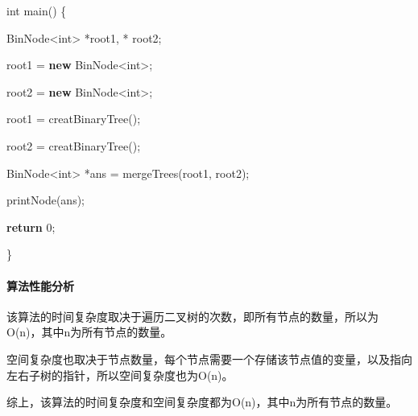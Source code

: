 \documentclass[
]{article}
\newenvironment{Shaded}{}{}
\newcommand{\ControlFlowTok}[1]{\textcolor[rgb]{0.00,0.44,0.13}{\textbf{#1}}}
\newcommand{\DataTypeTok}[1]{\textcolor[rgb]{0.56,0.13,0.00}{#1}}
\newcommand{\DecValTok}[1]{\textcolor[rgb]{0.25,0.63,0.44}{#1}}
\newcommand{\KeywordTok}[1]{\textcolor[rgb]{0.00,0.44,0.13}{\textbf{#1}}}
\newcommand{\NormalTok}[1]{#1}
\newcommand{\OperatorTok}[1]{\textcolor[rgb]{0.40,0.40,0.40}{#1}}
\begin{document}
\begin{Shaded}
\begin{Highlighting}[]
\DataTypeTok{int}\NormalTok{ main}\OperatorTok{()} \OperatorTok{\{}



\NormalTok{	BinNode}\OperatorTok{\textless{}}\DataTypeTok{int}\OperatorTok{\textgreater{}} \OperatorTok{*}\NormalTok{root1}\OperatorTok{,} \OperatorTok{*}\NormalTok{ root2}\OperatorTok{;}

\NormalTok{	root1 }\OperatorTok{=} \KeywordTok{new}\NormalTok{ BinNode}\OperatorTok{\textless{}}\DataTypeTok{int}\OperatorTok{\textgreater{};}

\NormalTok{	root2 }\OperatorTok{=} \KeywordTok{new}\NormalTok{ BinNode}\OperatorTok{\textless{}}\DataTypeTok{int}\OperatorTok{\textgreater{};}

\NormalTok{	root1 }\OperatorTok{=}\NormalTok{ creatBinaryTree}\OperatorTok{();}

\NormalTok{	root2 }\OperatorTok{=}\NormalTok{ creatBinaryTree}\OperatorTok{();}

\NormalTok{	BinNode}\OperatorTok{\textless{}}\DataTypeTok{int}\OperatorTok{\textgreater{}} \OperatorTok{*}\NormalTok{ans }\OperatorTok{=}\NormalTok{ mergeTrees}\OperatorTok{(}\NormalTok{root1}\OperatorTok{,}\NormalTok{ root2}\OperatorTok{);}

\NormalTok{	printNode}\OperatorTok{(}\NormalTok{ans}\OperatorTok{);}

	\ControlFlowTok{return} \DecValTok{0}\OperatorTok{;}

\OperatorTok{\}}
\end{Highlighting}
\end{Shaded}

\hypertarget{ux7b97ux6cd5ux6027ux80fdux5206ux6790}{%
\paragraph{算法性能分析}\label{ux7b97ux6cd5ux6027ux80fdux5206ux6790}}

该算法的时间复杂度取决于遍历二叉树的次数，即所有节点的数量，所以为O(n)，其中n为所有节点的数量。

空间复杂度也取决于节点数量，每个节点需要一个存储该节点值的变量，以及指向左右子树的指针，所以空间复杂度也为O(n)。

综上，该算法的时间复杂度和空间复杂度都为O(n)，其中n为所有节点的数量。
\end{document}

